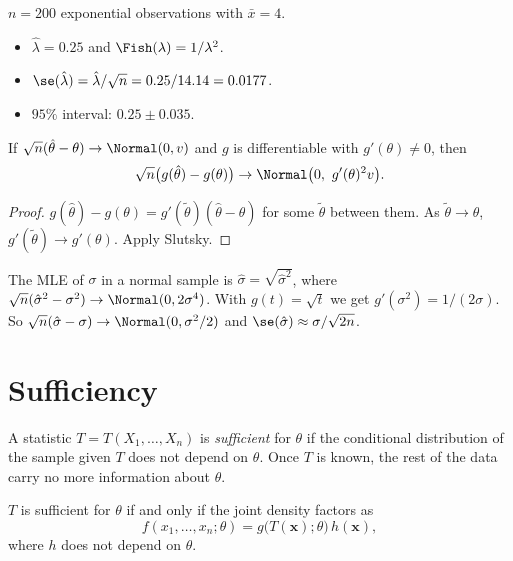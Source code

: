 \begin{example}
$n=200$ exponential observations with $\bar{x}=4$.
\begin{itemize}
  \item $\hat\lambda=0.25$ and $\Fish(\lambda)=1/\lambda^2$.
  \item $\se(\hat\lambda)=\hat\lambda/\sqrt n=0.25/14.14=0.0177$.
  \item $95\%$ interval: $0.25\pm0.035$.
\end{itemize}
\end{example}

\begin{theorem}\label{thm:delta}
If $\sqrt n(\hat\theta-\theta)\to\Normal(0,v)$ and $g$ is differentiable with $g'(\theta)\ne0$, then
\[ \sqrt n\big(g(\hat\theta)-g(\theta)\big)\to\Normal\big(0,\ g'(\theta)^2v\big). \]
\end{theorem}

\begin{proof}
$g(\hat\theta)-g(\theta)=g'(\tilde\theta)(\hat\theta-\theta)$ for some $\tilde\theta$ between them. As $\tilde\theta\to\theta$, $g'(\tilde\theta)\to g'(\theta)$. Apply Slutsky.
\end{proof}

\begin{example}
The MLE of $\sigma$ in a normal sample is $\hat\sigma=\sqrt{\hat\sigma^2}$, where $\sqrt n(\hat\sigma^2-\sigma^2)\to\Normal(0,2\sigma^4)$. With $g(t)=\sqrt t$ we get $g'(\sigma^2)=1/(2\sigma)$. So $\sqrt n(\hat\sigma-\sigma)\to\Normal(0,\sigma^2/2)$ and $\se(\hat\sigma)\approx\sigma/\sqrt{2n}$.
\end{example}

\section{Sufficiency}

\begin{definition}
A statistic $T=T(X_1,\dots,X_n)$ is \emph{sufficient} for $\theta$ if the conditional distribution of the sample given $T$ does not depend on $\theta$. Once $T$ is known, the rest of the data carry no more information about $\theta$.
\end{definition}

\begin{theorem}\label{thm:factor}
$T$ is sufficient for $\theta$ if and only if the joint density factors as
\[ f(x_1,\dots,x_n;\theta)=g\big(T(\mathbf{x});\theta\big)\,h(\mathbf{x}), \]
where $h$ does not depend on $\theta$.
\end{theorem}


